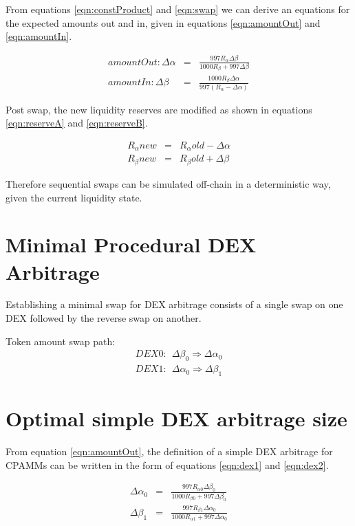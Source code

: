 \documentclass{article}
\begin{document}
	From equations \ref{eqn:constProduct} and \ref{eqn:swap} we can derive an equations for the expected amounts out and in, given in equations \ref{eqn:amountOut} and \ref{eqn:amountIn}. 
	
	\begin{eqnarray}
		amountOut: \Delta\alpha  &=& \frac{997 R_{\alpha} \Delta\beta }{1000 R_{\beta} + 997 \Delta\beta} \label{eqn:amountOut}\\
		amountIn: \Delta\beta  &=& \frac{1000 R_{\beta} \Delta\alpha }{997 (R_{\alpha} - \Delta\alpha)} \label{eqn:amountIn}
	\end{eqnarray}
	
	Post swap, the new liquidity reserves are modified as shown in equations \ref{eqn:reserveA} and \ref{eqn:reserveB}.
	
	\begin{eqnarray}
		R_{\alpha}{new}  &=& R_{\alpha}{old} - \Delta\alpha  \label{eqn:reserveA}\\
		R_{\beta}{new}  &=& R_{\beta}{old} + \Delta\beta  \label{eqn:reserveB}
	\end{eqnarray}
	
	Therefore sequential swaps can be simulated off-chain in a deterministic way, given the current liquidity state.
	
	\section{Minimal Procedural DEX Arbitrage}
	Establishing a minimal swap for DEX arbitrage consists of a single swap on one DEX followed by the reverse swap on another.
	
	Token amount swap path:
	\begin{eqnarray}
		DEX0: \: \: \Delta\beta_{0} \Rightarrow \Delta\alpha_{0}\\
		DEX1: \: \: \Delta\alpha_{0} \Rightarrow \Delta\beta_{1}
	\end{eqnarray}
	
	\section{Optimal simple DEX arbitrage size}
	From equation \ref{eqn:amountOut}, the definition of a simple DEX arbitrage for CPAMMs can be written in the form of equations \ref{eqn:dex1} and \ref{eqn:dex2}.
	
	\begin{eqnarray}
		 \Delta\alpha_{0}  &=& \frac{997 R_{\alpha 0} \Delta\beta_{0} }{1000 R_{\beta 0} + 997 \Delta\beta_{0}} \label{eqn:dex1}\\
		 \Delta\beta_{1}  &=& \frac{997 R_{\beta 1} \Delta\alpha_{0} }{1000 R_{\alpha 1} + 997 \Delta\alpha_{0}} \label{eqn:dex2}
	\end{eqnarray}
	
\end{document}
